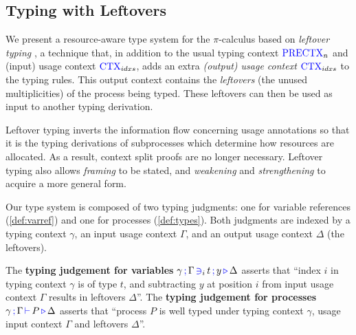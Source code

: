 \documentclass[runningheads]{llncs}
\newcommand{\picalc}{$\pi$-calculus}
\newcommand{\type}[1]{\textcolor{blue}{\operatorname{#1}}}
\newcommand{\types}[4]{#1 \, \type{;} \, #2 \, \type{\vdash} \, #3 \, \type{\triangleright} \, #4}
\newcommand{\contains}[6]{#1 \, \type{;} \, #2 \, \type{\ni}_{#3} \, #4 \, \type{;} \, #5 \, \type{\triangleright} \, #6}
\newcommand{\PreCtx}{\type{PRECTX}}
\newcommand{\Ctx}{\type{CTX}}
\begin{document}
\subsection{Typing with Leftovers}
\label{leftover-typing}

We present a resource-aware type system for the \picalc{} based on \emph{leftover typing} \cite{Allais2018a}, a technique that, in addition to the usual typing context $\PreCtx_n$ and (input) usage context $\Ctx_{idxs}$, adds an extra \emph{(output) usage context} $\Ctx_{idxs}$ to the typing rules.
This output context contains the \emph{leftovers} (the unused multiplicities) of the process being typed.
These leftovers can then be used as input to another typing derivation.

Leftover typing inverts the information flow concerning usage annotations so that it is the typing derivations of subprocesses which determine how resources are allocated.
As a result, context split proofs are no longer necessary.
Leftover typing also allows \emph{framing} to be stated, and \emph{weakening} and \emph{strengthening} to acquire a more general form.

Our type system is composed of two typing judgments: one for variable references (\autoref{def:varref}) and one for processes (\autoref{def:types}).
Both judgments are indexed by a typing context $\gamma$, an input usage context $\Gamma$, and an output usage context $\Delta$ (the leftovers).

The \textbf{typing judgement for variables} $\contains{\gamma}{\Gamma}{i}{t}{y}{\Delta}$ asserts that ``index $i$ in typing context $\gamma$ is of type $t$, and subtracting $y$ at position $i$ from input usage context $\Gamma$ results in leftovers $\Delta$''.
The \textbf{typing judgement for processes} $\types{\gamma}{\Gamma}{P}{\Delta}$ asserts that ``process $P$ is well typed under typing context $\gamma$, usage input context $\Gamma$ and leftovers $\Delta$''.
\end{document}
